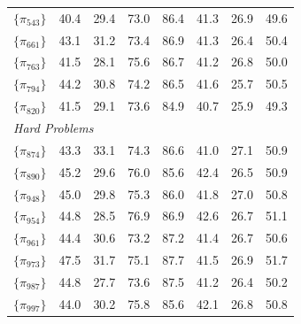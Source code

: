 \begin{table}[ht!]
{\begin{tabular}{lccccccc}
$\{\pi_{543}\}$ & 40.4 & 29.4 & 73.0 & 86.4 & 41.3 & 26.9 & 49.6 \\
$\{\pi_{661}\}$ & 43.1 & 31.2 & 73.4 & 86.9 & 41.3 & 26.4 & 50.4 \\
$\{\pi_{763}\}$ & 41.5 & 28.1 & 75.6 & 86.7 & 41.2 & 26.8 & 50.0 \\
$\{\pi_{794}\}$ & 44.2 & 30.8 & 74.2 & 86.5 & 41.6 & 25.7 & 50.5 \\
$\{\pi_{820}\}$ & 41.5 & 29.1 & 73.6 & 84.9 & 40.7 & 25.9 & 49.3 \\
\midrule
\multicolumn{8}{l}{\textit{Hard Problems}} \\
$\{\pi_{874}\}$ & 43.3 & 33.1 & 74.3 & 86.6 & 41.0 & 27.1 & 50.9 \\
$\{\pi_{890}\}$ & 45.2 & 29.6 & 76.0 & 85.6 & 42.4 & 26.5 & 50.9 \\
$\{\pi_{948}\}$ & 45.0 & 29.8 & 75.3 & 86.0 & 41.8 & 27.0 & 50.8 \\
$\{\pi_{954}\}$ & 44.8 & 28.5 & 76.9 & 86.9 & 42.6 & 26.7 & 51.1 \\
$\{\pi_{961}\}$ & 44.4 & 30.6 & 73.2 & 87.2 & 41.4 & 26.7 & 50.6 \\
$\{\pi_{973}\}$ & 47.5 & 31.7 & 75.1 & 87.7 & 41.5 & 26.9 & 51.7 \\
$\{\pi_{987}\}$ & 44.8 & 27.7 & 73.6 & 87.5 & 41.2 & 26.4 & 50.2 \\
$\{\pi_{997}\}$ & 44.0 & 30.2 & 75.8 & 85.6 & 42.1 & 26.8 & 50.8 \\
\bottomrule
\end{tabular}
}
\end{table}

